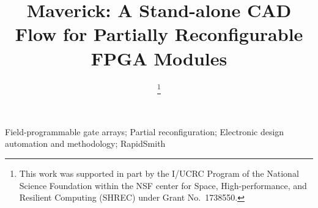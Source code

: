 \documentclass[conference]{IEEEtran}
\begin{document}
\title{Maverick: A Stand-alone CAD Flow for Partially Reconfigurable FPGA Modules}




\author{
	\thanks{This work was supported in part by the I/UCRC Program of the National Science Foundation within the NSF center for Space, High-performance, and Resilient Computing (SHREC) under Grant No.~1738550.}
}


\maketitle



\begin{IEEEkeywords}
	Field-programmable gate arrays; Partial reconfiguration; Electronic design automation and methodology; RapidSmith
\end{IEEEkeywords}

%
\IEEEpeerreviewmaketitle










\end{document}
